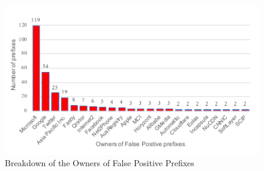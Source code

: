 \begin{figure}[h]
\vspace{-6pt}
	\centerline{\includegraphics[scale=0.58]{fig/FP_owners.pdf}}
	\caption{Breakdown of the Owners of False Positive Prefixes}
	\label{FP_owners}
\end{figure}
